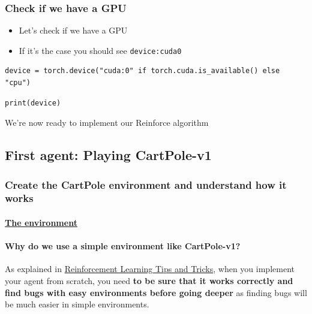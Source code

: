 \documentclass[11pt,a4paper]{article}
\begin{document}
\subsubsection{Check if we have a GPU}\label{check-if-we-have-a-gpu}

\begin{itemize}
\tightlist
\item
  Let's check if we have a GPU
\item
  If it's the case you should see \texttt{device:cuda0}
\end{itemize}

\begin{lstlisting}
device = torch.device("cuda:0" if torch.cuda.is_available() else "cpu")
\end{lstlisting}

\begin{lstlisting}
print(device)
\end{lstlisting}

We're now ready to implement our Reinforce algorithm

\subsection{First agent: Playing CartPole-v1}\label{first-agent-playing-cartpole-v1}

\subsubsection{Create the CartPole environment and understand how it works}\label{create-the-cartpole-environment-and-understand-how-it-works}

\paragraph{\texorpdfstring{\href{https://www.gymlibrary.dev/environments/classic_control/cart_pole/}{The environment}}{The environment}}\label{the-environment}

\paragraph{Why do we use a simple environment like CartPole-v1?}\label{why-do-we-use-a-simple-environment-like-cartpole-v1}

As explained in \href{https://stable-baselines3.readthedocs.io/en/master/guide/rl_tips.html}{Reinforcement Learning Tips and Tricks}, when you implement your agent from scratch, you need \textbf{to be sure that it works correctly and find bugs with easy environments before going deeper} as finding bugs will be much easier in simple environments.
\end{document}

